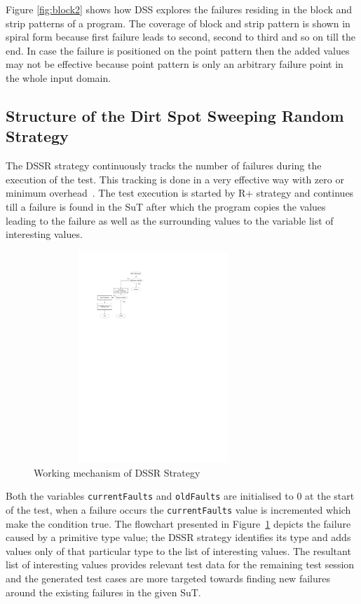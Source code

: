 \documentclass[conference]{IEEEtran}
\begin{document}
Figure \ref{fig:block2} shows how DSS explores the failures residing in the block and strip patterns of a program. The coverage of block and strip pattern is shown in spiral form because first failure leads to second, second to third and so on till the end. In case the failure is positioned on the point pattern then the added values may not be effective because point pattern is only an arbitrary failure point in the whole input domain.

\subsection{Structure of the Dirt Spot Sweeping Random Strategy}

The DSSR strategy continuously tracks the number of failures during the execution of the test. This tracking is done in a very effective way with zero or minimum overhead~\cite{Leitner2009}. The test execution is started by R+ strategy and continues till a failure is found in the SuT after which the program copies the values leading to the failure as well as the surrounding values to the variable list of interesting values. 

\begin{figure}[ht]
\centering
\includegraphics[width= 9cm,height=8cm]{flowchart1.pdf}
\caption{Working mechanism of DSSR Strategy}
\label{fig:Working_DSSS}
\end{figure}

Both the variables \verb+currentFaults+ and \verb+oldFaults+ are initialised to 0 at the start of the test, when a failure occurs the  \verb+currentFaults+ value is incremented which make the condition true. The flowchart presented in Figure~\ref{fig:Working_DSSS} depicts the failure caused by a primitive type value; the DSSR strategy identifies its type and adds values only of that particular type to the list of interesting values. The resultant list of interesting values provides relevant test data for the remaining test session and the generated test cases are more targeted towards finding new failures around the existing failures in the given SuT.
\end{document}
